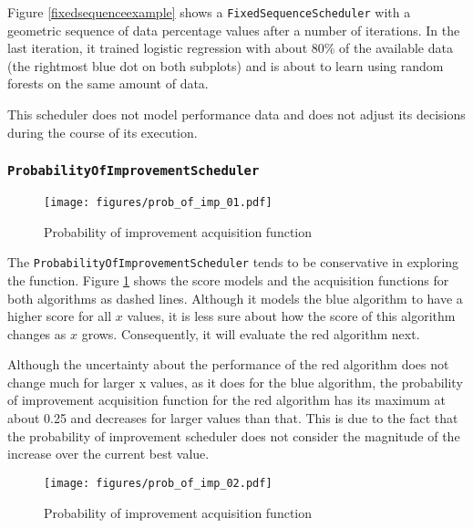 \documentclass[a4paper,12pt,twoside,openright]{report}
\begin{document}
Figure \ref{fixedsequenceexample} shows a \texttt{FixedSequenceScheduler} with a geometric sequence of data percentage values after a number of iterations. In the last iteration, it trained logistic regression with about 80\% of the available data (the rightmost blue dot on both subplots) and is about to learn using random forests on the same amount of data.

This scheduler does not model performance data and does not adjust its decisions during the course of its execution.


\subsubsection{\texttt{ProbabilityOfImprovementScheduler}}
\begin{figure}
\centering
  \texttt{[image: figures/prob\_of\_imp\_01.pdf]}
  \caption{Probability of improvement acquisition function}
  \label{sched:probofimpr1}
\end{figure}

The \texttt{ProbabilityOfImprovementScheduler} tends to be conservative in exploring the function. Figure \ref{sched:probofimpr1} shows the score models and the acquisition functions for both algorithms as dashed lines. Although it models the blue algorithm to have a higher score for all $x$ values, it is less sure about how the score of this algorithm changes as $x$ grows. Consequently, it will evaluate the red algorithm next.

Although the uncertainty about the performance of the red algorithm does not change much for larger x values, as it does for the blue algorithm, the probability of improvement acquisition function for the red algorithm has its maximum at about 0.25 and decreases for larger values than that. This is due to the fact that the probability of improvement scheduler does not consider the magnitude of the increase over the current best value.

\begin{figure}
\centering
  \texttt{[image: figures/prob\_of\_imp\_02.pdf]}
  \caption{Probability of improvement acquisition function}
  \label{sched:probofimpr2}
\end{figure}
\end{document}
